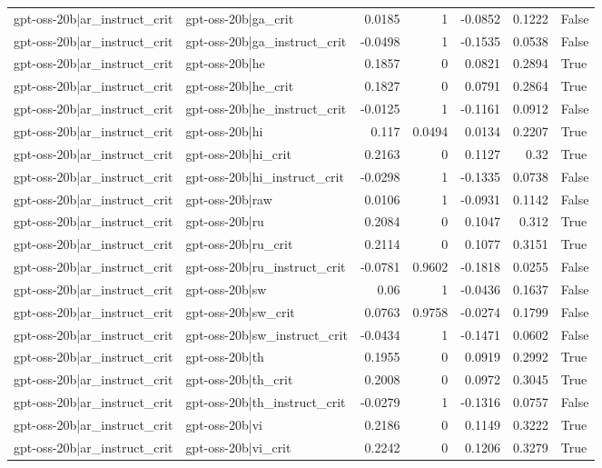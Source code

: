 \begin{table}
\begin{tabular}{l l r r r r l}
gpt-oss-20b|ar_instruct_crit & gpt-oss-20b|ga_crit & 0.0185 & 1 & -0.0852 & 0.1222 & False \\
gpt-oss-20b|ar_instruct_crit & gpt-oss-20b|ga_instruct_crit & -0.0498 & 1 & -0.1535 & 0.0538 & False \\
gpt-oss-20b|ar_instruct_crit & gpt-oss-20b|he & 0.1857 & 0 & 0.0821 & 0.2894 & True \\
gpt-oss-20b|ar_instruct_crit & gpt-oss-20b|he_crit & 0.1827 & 0 & 0.0791 & 0.2864 & True \\
gpt-oss-20b|ar_instruct_crit & gpt-oss-20b|he_instruct_crit & -0.0125 & 1 & -0.1161 & 0.0912 & False \\
gpt-oss-20b|ar_instruct_crit & gpt-oss-20b|hi & 0.117 & 0.0494 & 0.0134 & 0.2207 & True \\
gpt-oss-20b|ar_instruct_crit & gpt-oss-20b|hi_crit & 0.2163 & 0 & 0.1127 & 0.32 & True \\
gpt-oss-20b|ar_instruct_crit & gpt-oss-20b|hi_instruct_crit & -0.0298 & 1 & -0.1335 & 0.0738 & False \\
gpt-oss-20b|ar_instruct_crit & gpt-oss-20b|raw & 0.0106 & 1 & -0.0931 & 0.1142 & False \\
gpt-oss-20b|ar_instruct_crit & gpt-oss-20b|ru & 0.2084 & 0 & 0.1047 & 0.312 & True \\
gpt-oss-20b|ar_instruct_crit & gpt-oss-20b|ru_crit & 0.2114 & 0 & 0.1077 & 0.3151 & True \\
gpt-oss-20b|ar_instruct_crit & gpt-oss-20b|ru_instruct_crit & -0.0781 & 0.9602 & -0.1818 & 0.0255 & False \\
gpt-oss-20b|ar_instruct_crit & gpt-oss-20b|sw & 0.06 & 1 & -0.0436 & 0.1637 & False \\
gpt-oss-20b|ar_instruct_crit & gpt-oss-20b|sw_crit & 0.0763 & 0.9758 & -0.0274 & 0.1799 & False \\
gpt-oss-20b|ar_instruct_crit & gpt-oss-20b|sw_instruct_crit & -0.0434 & 1 & -0.1471 & 0.0602 & False \\
gpt-oss-20b|ar_instruct_crit & gpt-oss-20b|th & 0.1955 & 0 & 0.0919 & 0.2992 & True \\
gpt-oss-20b|ar_instruct_crit & gpt-oss-20b|th_crit & 0.2008 & 0 & 0.0972 & 0.3045 & True \\
gpt-oss-20b|ar_instruct_crit & gpt-oss-20b|th_instruct_crit & -0.0279 & 1 & -0.1316 & 0.0757 & False \\
gpt-oss-20b|ar_instruct_crit & gpt-oss-20b|vi & 0.2186 & 0 & 0.1149 & 0.3222 & True \\
gpt-oss-20b|ar_instruct_crit & gpt-oss-20b|vi_crit & 0.2242 & 0 & 0.1206 & 0.3279 & True \\

\end{tabular}
\end{table}
